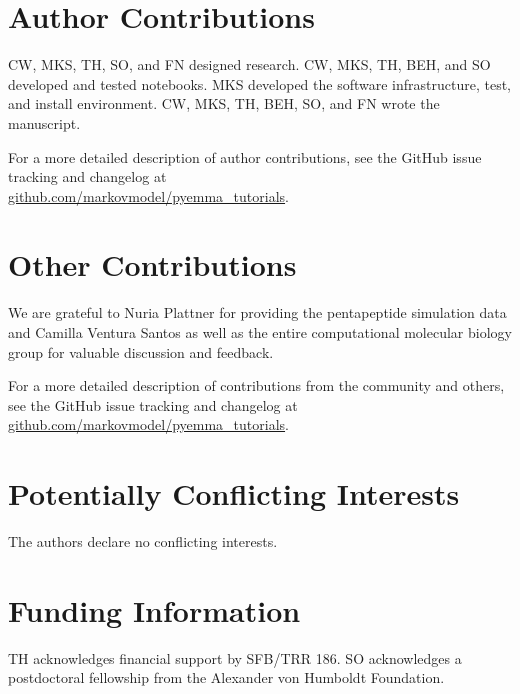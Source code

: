 \documentclass[9pt,tutorial]{livecoms}
\newcommand{\githubrepository}{\url{github.com/markovmodel/pyemma_tutorials}}
\begin{document}
\section{Author Contributions}
%
CW, MKS, TH, SO, and FN designed research.
CW, MKS, TH, BEH, and SO developed and tested notebooks.
MKS developed the software infrastructure, test, and install environment.
CW, MKS, TH, BEH, SO, and FN wrote the manuscript.

For a more detailed description of author contributions, see the GitHub issue tracking and changelog at\\\githubrepository{}.

\section{Other Contributions}
%
We are grateful to Nuria Plattner for providing the pentapeptide simulation data and Camilla Ventura Santos as well as the entire computational molecular biology group for valuable discussion and feedback.

For a more detailed description of contributions from the community and others, see the GitHub issue tracking and changelog at \githubrepository{}.

\section{Potentially Conflicting Interests}
The authors declare no conflicting interests.

\section{Funding Information}
TH acknowledges financial support by SFB/TRR 186. SO acknowledges a postdoctoral fellowship from the Alexander von Humboldt Foundation.




\end{document}
